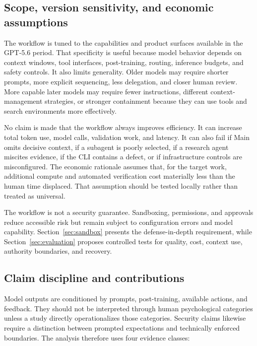 \documentclass[11pt,a4paper]{article}
\begin{document}
\subsection{Scope, version sensitivity, and economic assumptions}\label{sec:scope-limitations}

The workflow is tuned to the capabilities and product surfaces available in the GPT-5.6 period. That specificity is useful because model behavior depends on context windows, tool interfaces, post-training, routing, inference budgets, and safety controls. It also limits generality. Older models may require shorter prompts, more explicit sequencing, less delegation, and closer human review. More capable later models may require fewer instructions, different context-management strategies, or stronger containment because they can use tools and search environments more effectively.

No claim is made that the workflow always improves efficiency. It can increase total token use, model calls, validation work, and latency. It can also fail if Main omits decisive context, if a subagent is poorly selected, if a research agent miscites evidence, if the CLI contains a defect, or if infrastructure controls are misconfigured. The economic rationale assumes that, for the target work, additional compute and automated verification cost materially less than the human time displaced. That assumption should be tested locally rather than treated as universal.

The workflow is not a security guarantee. Sandboxing, permissions, and approvals reduce accessible risk but remain subject to configuration errors and model capability. Section~\ref{sec:sandbox} presents the defense-in-depth requirement, while Section~\ref{sec:evaluation} proposes controlled tests for quality, cost, context use, authority boundaries, and recovery.

\subsection{Claim discipline and contributions}\label{sec:claim-discipline}

Model outputs are conditioned by prompts, post-training, available actions, and feedback. They should not be interpreted through human psychological categories unless a study directly operationalizes those categories. Security claims likewise require a distinction between prompted expectations and technically enforced boundaries. The analysis therefore uses four evidence classes:
\end{document}
